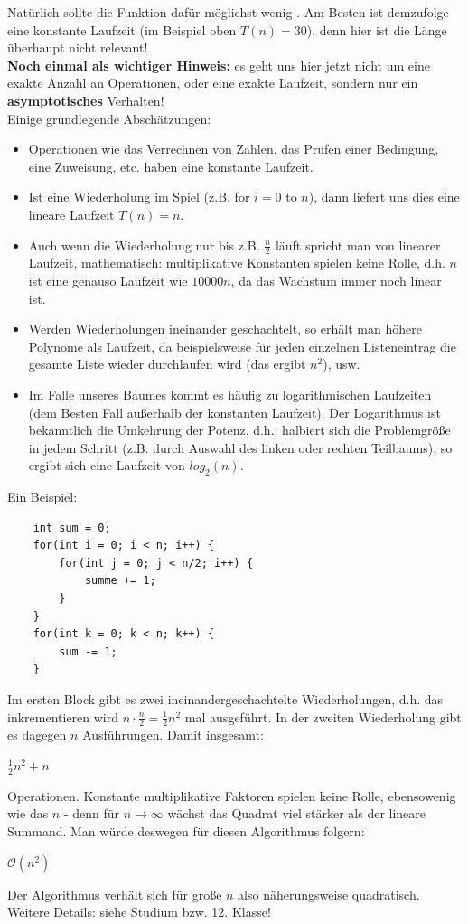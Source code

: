 \documentclass{article}
\begin{document}
Natürlich sollte die Funktion dafür möglichst wenig . Am Besten ist demzufolge eine konstante Laufzeit (im Beispiel oben $T(n)=30$), denn hier ist die Länge überhaupt nicht relevant! \\
\textbf{Noch einmal als wichtiger Hinweis:} es geht uns hier jetzt nicht um eine exakte Anzahl an Operationen, oder eine exakte Laufzeit, sondern nur ein \textbf{asymptotisches} Verhalten!  \\
Einige grundlegende Abschätzungen:
\begin{itemize}
    \item {} Operationen wie das Verrechnen von Zahlen, das Prüfen einer Bedingung, eine Zuweisung, etc. haben eine konstante Laufzeit. 
    \item Ist eine Wiederholung im Spiel (z.B. for $i = 0$ to $n$), dann liefert uns dies eine lineare Laufzeit $T(n) = n$.
    \item Auch wenn die Wiederholung nur bis z.B. $\frac{n}{2}$ läuft spricht man von linearer Laufzeit, mathematisch: multiplikative Konstanten spielen keine Rolle, d.h. $n$ ist eine genauso  Laufzeit wie $10000n$, da das Wachstum immer noch linear ist.
    \item Werden Wiederholungen ineinander geschachtelt, so erhält man höhere Polynome als Laufzeit, da beispielsweise für jeden einzelnen Listeneintrag die gesamte Liste wieder durchlaufen wird (das ergibt $n^2$), usw. 
    \item Im Falle unseres Baumes kommt es häufig zu logarithmischen Laufzeiten (dem Besten Fall außerhalb der konstanten Laufzeit). Der Logarithmus ist bekanntlich die Umkehrung der Potenz, d.h.: halbiert sich die Problemgröße in jedem Schritt (z.B. durch Auswahl des linken oder rechten Teilbaums), so ergibt sich eine Laufzeit von $log_2(n)$.  
\end{itemize}
Ein Beispiel:
\begin{verbatim}
    int sum = 0;
    for(int i = 0; i < n; i++) {
        for(int j = 0; j < n/2; i++) {
            summe += 1;
        }
    }
    for(int k = 0; k < n; k++) {
        sum -= 1;
    }
\end{verbatim}
Im ersten Block gibt es zwei ineinandergeschachtelte Wiederholungen, d.h. das inkrementieren wird $n \cdot \frac{n}{2} = \frac{1}{2} n^2$ mal ausgeführt. In der zweiten Wiederholung gibt es dagegen $n$ Ausführungen. Damit insgesamt:
\begin{center}
    $\frac{1}{2} n^2 + n$
\end{center}
Operationen. Konstante multiplikative Faktoren spielen keine Rolle, ebensowenig wie das $n$ - denn für $n\rightarrow \infty$ wächst das Quadrat viel stärker als der lineare Summand. Man würde deswegen für diesen Algorithmus folgern:
\begin{center}
    $\mathcal{O}(n^2)$
\end{center}
Der Algorithmus verhält sich für große $n$ also näherungsweise quadratisch. \\
Weitere Details: siehe Studium bzw. 12. Klasse!
\end{document}
